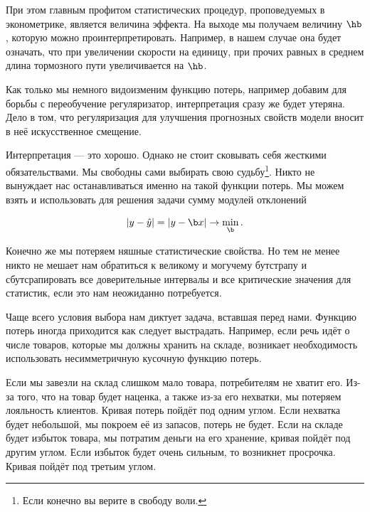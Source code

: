 \documentclass[12pt, a4paper, oneside]{article}
\begin{document}
При этом главным профитом статистических процедур, проповедуемых в эконометрике,  является величина эффекта. На выходе мы получаем величину $\hb$, которую можно проинтерпретировать. Например, в нашем случае она будет означать, что при увеличении скорости на единицу, при прочих равных в среднем длина тормозного пути увеличивается на $\hb$. 

Как только мы немного видоизменим функцию потерь, например добавим для борьбы с переобучение регуляризатор, интерпретация сразу же будет утеряна. Дело в том, что регуляризация для улучшения прогнозных свойств модели вносит в неё искусственное смещение. 

Интерпретация --- это хорошо. Однако не стоит сковывать себя жесткими обязательствами.  Мы свободны сами выбирать свою судьбу\footnote{Если конечно вы верите в свободу воли.}. Никто не вынуждает нас останавливаться именно на такой функции потерь.  Мы можем взять и использовать для решения задачи сумму модулей отклонений

\[ |y - \hat y| = |y - \b x| \to \min_{\b}. \]

Конечно же мы потеряем няшные статистические свойства. Но тем не менее никто не мешает нам обратиться к великому и могучему бутстрапу и сбутсрапировать все доверительные интервалы и все критические значения для статистик, если это нам неожиданно потребуется. 

Чаще всего условия выбора нам диктует задача, вставшая перед нами. Функцию потерь иногда приходится как следует выстрадать. Например, если речь идёт о числе товаров, которые мы должны хранить на складе, возникает необходимость использовать несимметричную кусочную функцию потерь.  

Если мы завезли на склад слишком мало товара, потребителям не хватит его. Из-за того, что на товар будет наценка, а также из-за его нехватки, мы потеряем лояльность клиентов. Кривая потерь пойдёт под одним углом. Если нехватка будет небольшой, мы покроем её из запасов, потерь не будет. Если на складе будет избыток товара, мы потратим деньги на его хранение, кривая пойдёт под другим углом. Если избыток будет очень сильным, то возникнет просрочка. Кривая пойдёт под третьим углом.  

\begin{center}
\end{center}
\end{document}
